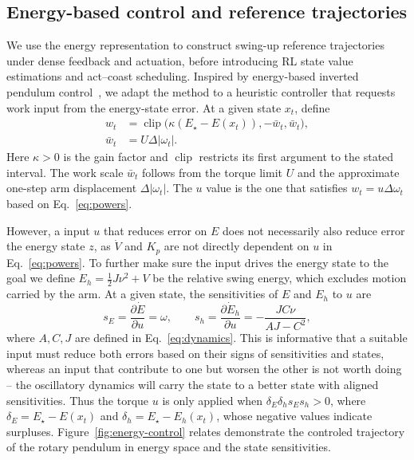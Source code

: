 \documentclass[letterpaper,10pt,conference]{ieeeconf}
\newcommand{\Estar}{E_{\star}}
\begin{document}
\subsection{Energy-based control and reference trajectories}
\label{sec:contorller}
We use the energy representation to construct swing-up reference trajectories under dense feedback and actuation, before introducing RL state value estimations and act--coast scheduling. Inspired by energy-based inverted pendulum control~\cite{astrom2000}, we adapt the method to a heuristic controller that requests work input from the energy-state error. At a given state $x_t$, define
\begin{equation}
\begin{aligned}
 w_t&=\operatorname{clip}\bigl(\kappa(\Estar-E(x_t)),-\bar w_t,\bar w_t\bigr),\\
 \bar w_t&=U\Delta|\omega_t|.
\end{aligned}
\label{eq:workpolicy}
\end{equation}
Here $\kappa>0$ is the gain factor and $\operatorname{clip}$ restricts its first argument to the stated interval. The work scale $\bar w_t$ follows from the torque limit $U$ and the approximate one-step arm displacement $\Delta|\omega_t|$. The $u$ value is the one that satisfies $w_t=u\Delta\omega_t$ based on Eq.~\eqref{eq:powers}.

However, a input $u$ that reduces error on $E$ does not necessarily also reduce error the energy state $z$, as $\dot V$ and $K_p$ are not directly dependent on $u$ in Eq.~\eqref{eq:powers}. To further make sure the input drives the energy state to the goal we define $E_h=\tfrac12J\nu^2+V$ be the relative swing energy, which excludes motion carried by the arm. At a given state, the sensitivities of $E$ and $E_h$ to $u$ are
\begin{equation}
 s_E=\frac{\partial\dot E}{\partial u}=\omega,\qquad
 s_h=\frac{\partial\dot E_h}{\partial u}=-\frac{JC\nu}{AJ-C^2},
\label{eq:energy-authority}
\end{equation}
where $A,C,J$ are defined in Eq.~\eqref{eq:dynamics}. This is informative that a suitable input must reduce both errors based on their signs of sensitivities and states, whereas an input that contribute to one but worsen the other is not worth doing -- the oscillatory dynamics will carry the state to a better state with aligned sensitivities. Thus the torque $u$ is only applied when $\delta_E\delta_hs_Es_h>0$, 
where $\delta_E=\Estar-E(x_t)$ and $\delta_h=\Estar-E_h(x_t)$, whose negative values indicate surpluses. Figure~\ref{fig:energy-control} relates demonstrate the controled trajectory of the rotary pendulum in energy space and the state sensitivities.
\end{document}
